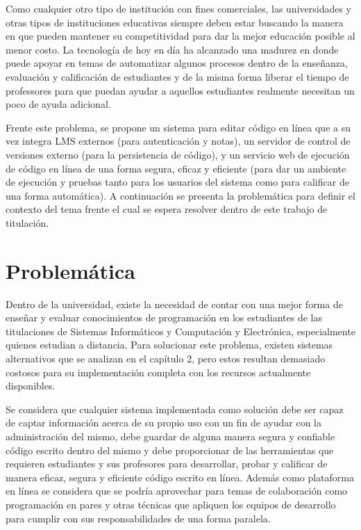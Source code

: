 Como cualquier otro tipo de institución con fines comerciales, las universidades y otras tipos de instituciones educativas siempre deben estar buscando la manera en que pueden mantener su competitividad para dar la mejor educación posible al menor costo. La tecnología de hoy en día ha alcanzado una madurez en donde puede apoyar en temas de automatizar algunos procesos dentro de la enseñanza, evaluación y calificación de estudiantes y de la misma forma liberar el tiempo de professores para que puedan ayudar a aquellos estudiantes realmente necesitan un poco de ayuda adicional.
 
Frente este problema, se propone un sistema para editar código en línea que a su vez integra LMS  externos (para autenticación y notas), un servidor de control de versiones externo (para la persistencia de código), y un servicio web de ejecución de código en línea de una forma segura, eficaz y eficiente (para dar un ambiente de ejecución y pruebas tanto para los usuarios del sistema como para calificar de una forma automática). A continuación se presenta la problemática para definir el contexto del tema frente el cual se espera resolver dentro de este trabajo de titulación. 

\section{Problemática}
Dentro de la universidad, existe la necesidad de contar con una mejor forma de enseñar y evaluar conocimientos de programación en los estudiantes de las titulaciones de Sistemas Informáticos y Computación y Electrónica, especialmente quienes estudian a distancia. Para solucionar este problema, existen sistemas alternativos que se analizan en el capítulo 2, pero estos resultan demasiado costosos para su implementación completa con los recursos actualmente disponibles.
 
Se considera que cualquier sistema implementada como solución debe ser capaz de captar información acerca de su propio uso con un fin de ayudar con la administración del mismo, debe guardar de alguna manera segura y confiable código escrito dentro del mismo y debe proporcionar de las herramientas que requieren estudiantes y sus profesores para desarrollar, probar y calificar de manera eficaz, segura y eficiente código escrito en línea. Además como plataforma en línea se considera que se podría aprovechar para temas de colaboración como programación en pares y otras técnicas que apliquen los equipos de desarrollo para cumplir con sus responsabilidades de una forma paralela.

